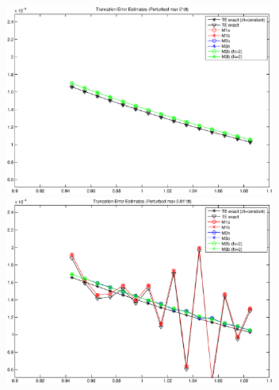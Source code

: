 \documentclass[10pt]{article}%
\begin{document}
\break
\begin{figure}[H]
  \begin{minipage}{0.5\textwidth}
    \centering
    \includegraphics[width=3.5in]{TE_ex_vs_est_equalspacing}
  \end{minipage}
  \hfill
  \begin{minipage}{0.5\textwidth}
    \centering
    \includegraphics[width=3.5in]{TE_ex_vs_est_01}
  \end{minipage}
\end{figure}
\end{document}

